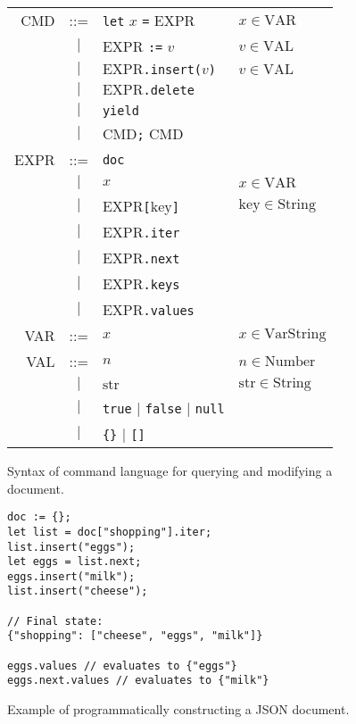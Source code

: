 \documentclass[10pt,journal,compsoc]{IEEEtran}
\begin{document}
\begin{figure}
\centering
\begin{tabular}{rcll}
CMD & ::= & \texttt{let} $x$ \texttt{=} EXPR & $x \in \mathrm{VAR}$ \\
& $|$ & $\mathrm{EXPR}$ \texttt{:=} $v$ & $v \in \mathrm{VAL}$ \\
& $|$ & $\mathrm{EXPR}$\texttt{.insert(}$v$\texttt{)} & $v \in \mathrm{VAL}$ \\
& $|$ & $\mathrm{EXPR}$\texttt{.delete} \\
& $|$ & \texttt{yield} \\
& $|$ & CMD\texttt{;} CMD \vspace{0.5em}\\
EXPR & ::= & \texttt{doc} \\
& $|$ & $x$ & $x \in \mathrm{VAR}$ \\
& $|$ & EXPR\texttt{[}$\mathrm{key}$\texttt{]} & $\mathrm{key} \in \mathrm{String}$ \\
& $|$ & EXPR\texttt{.iter} \\
& $|$ & EXPR\texttt{.next} \\
& $|$ & EXPR\texttt{.keys} \\
& $|$ & EXPR\texttt{.values} \vspace{0.5em}\\
VAR & ::= & $x$ & $x \in \mathrm{VarString}$\\
VAL & ::= & $n$ & $n \in \mathrm{Number}$ \\
& $|$ & $\mathrm{str}$ & $\mathrm{str} \in \mathrm{String}$ \\
& $|$ & \texttt{true} $|$ \texttt{false} $|$ \texttt{null} \\
& $|$ & \verb|{}| $|$ \verb|[]|
\end{tabular}
\caption{Syntax of command language for querying and modifying a document.}\label{fig:local-syntax}
\end{figure}

\begin{figure}
\centering
\begin{verbatim}
doc := {};
let list = doc["shopping"].iter;
list.insert("eggs");
let eggs = list.next;
eggs.insert("milk");
list.insert("cheese");

// Final state:
{"shopping": ["cheese", "eggs", "milk"]}

eggs.values // evaluates to {"eggs"}
eggs.next.values // evaluates to {"milk"}
\end{verbatim}
\caption{Example of programmatically constructing a JSON document.}\label{fig:make-doc}
\end{figure}
\end{document}
